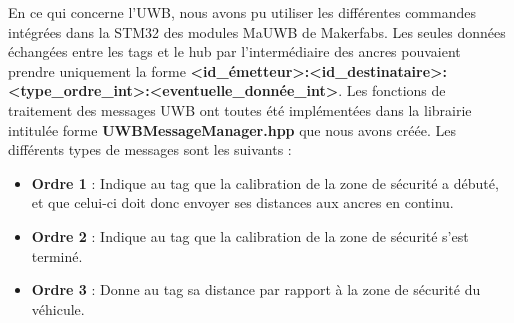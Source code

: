 En ce qui concerne l'UWB, nous avons pu utiliser les différentes commandes intégrées dans la STM32 des modules MaUWB de Makerfabs. Les seules données échangées entre les tags et le hub par l'intermédiaire des ancres pouvaient prendre uniquement la forme {\ttfamily \textbf{<id\_émetteur>:<id\_destinataire>\allowbreak:<type\_ordre\_int>:<eventuelle\_donnée\_int>}}. Les fonctions de traitement des messages UWB ont toutes été implémentées dans la librairie intitulée forme {\ttfamily \textbf{UWBMessageManager.hpp}} que nous avons créée. Les différents types de messages sont les suivants :


\begin{itemize}
    \item {\ttfamily \textbf{Ordre 1}} : Indique au tag que la calibration de la zone de sécurité a débuté, et que celui-ci doit donc envoyer ses distances aux ancres en continu.
    \item {\ttfamily \textbf{Ordre 2}} : Indique au tag que la calibration de la zone de sécurité s'est terminé.
    \item {\ttfamily \textbf{Ordre 3}} : Donne au tag sa distance par rapport à la zone de sécurité du véhicule.
\end{itemize}